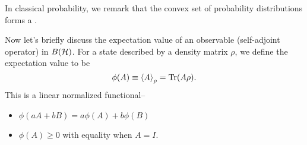 In classical probability, we remark that the convex set of probability distributions forms a .

Now let's briefly discuss the expectation value of an observable (self-adjoint operator) in $B(\mathcal H)$. For a state described by a density matrix $\rho$, we define the expectation value to be
\begin{equation}
    \phi(A) \equiv \left< A \right>_\rho =\operatorname{Tr}(A \rho).
\end{equation}
This is a linear normalized functional--
\begin{itemize}
    \item $\phi(aA +b B) = a\phi(A) + b\phi(B)$
    \item $\phi(A)\geq 0$ with equality when $A=I$.
\end{itemize}